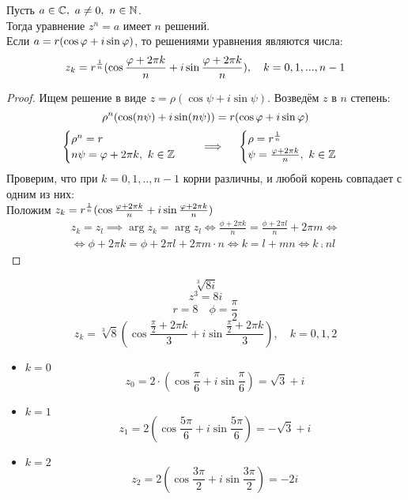 \begin{theorem}
	Пусть $a \in \mathbb{C}, ~ a \ne 0, ~ n \in \mathbb{N} $. \\
    Тогда уравнение $z^n = a $ имеет $n$ решений. \\
    Если $ a = r(\cos \varphi + i \sin \varphi) $, то решениями уравнения являются числа:
    $$ z_k = r^{\frac1n} (\cos \frac{\varphi + 2 \pi k}n + i \sin \frac{\varphi + 2 \pi k}n), \quad k = 0, 1, ..., n - 1 $$
\end{theorem}

\begin{proof}
	Ищем решение в виде $z = \rho (\cos \psi + i \sin \psi) $. Возведём $z$ в $n$ степень:
    $$ \rho^n (\cos (n \psi) + i \sin (n \psi)) = r(\cos \varphi + i \sin \varphi) $$
    $$ \begin{cases} \rho^n = r \\ n\psi = \varphi + 2 \pi k, ~ k \in \mathbb{Z} \end{cases} \quad \implies \quad \begin{cases} \rho = r^{\frac1n} \\ \psi = \frac{\varphi + 2 \pi k}n, ~ k \in \mathbb{Z} \end{cases} $$
    Проверим, что при $ k = 0, 1, .., n - 1 $ корни различны, и любой корень совпадает с одним из них:\\
    Положим $ z_k = r^{\frac1n} (\cos \frac{\varphi + 2 \pi k}n + i \sin \frac{\varphi + 2 \pi k}n) $
    \begin{multline*}
        z_k = z_l \implies \arg z_k = \arg z_l \iff \frac{\phi + 2 \pi k}n = \frac{\phi + 2 \pi l}n + 2 \pi m \iff \\ \iff \phi + 2 \pi k = \phi + 2 \pi l + 2 \pi m \cdot n \iff k = l + mn \iff k \comp{n} l
    \end{multline*}
\end{proof}

\begin{eg}
    $$ \sqrt[3]{8i} $$
    $$ z^3 = 8i $$
    $$ r = 8 \quad \phi = \frac{\pi}2 $$
    $$ z_k = \sqrt[3]{8}(\cos \frac{\frac{\pi}2 + 2 \pi k}3 + i \sin \frac{\frac{\pi}2 + 2 \pi k}3), \quad k = 0, 1, 2 $$
    \begin{itemize}
    	\item $ k = 0 $
        $$ z_0 = 2 \cdot (\cos \frac{\pi}6 + i \sin \frac{\pi}6) = \sqrt3 + i $$
        \item $ k = 1 $
        $$ z_1 = 2 (\cos \frac{5\pi}6 + i \sin \frac{5\pi}6) = - \sqrt3 + i $$
        \item $ k = 2 $
        $$ z_2 = 2 (\cos \frac{3\pi}2 + i \sin \frac{3\pi}2) = -2i $$
    \end{itemize}

\end{eg}

